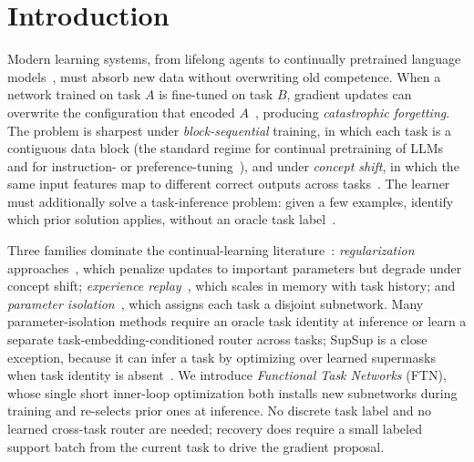 \documentclass{article}
\theoremstyle{plain}
\theoremstyle{remark}
\begin{document}
\section{Introduction}
\label{sec:intro}
Modern learning systems, from lifelong agents to continually pretrained language models~\citep{gururangan2020dontstop,yildiz2024investigating}, must absorb new data without overwriting old competence. When a network trained on task $A$ is fine-tuned on task $B$, gradient updates can overwrite the configuration that encoded $A$~\citep{mccloskey1989catastrophic,french1999catastrophic}, producing \emph{catastrophic forgetting}. The problem is sharpest under \emph{block-sequential} training, in which each task is a contiguous data block (the standard regime for continual pretraining of LLMs and for instruction- or preference-tuning~\citep{ouyang2022training,rafailov2023direct}), and under \emph{concept shift}, in which the same input features map to different correct outputs across tasks~\citep{gama2014concept}. The learner must additionally solve a task-inference problem: given a few examples, identify which prior solution applies, without an oracle task label~\citep{aljundi2019taskfree,vandeven2019three}.

Three families dominate the continual-learning literature~\citep{parisi2019continual}: \emph{regularization} approaches~\citep{kirkpatrick2017overcoming,zenke2017continual}, which penalize updates to important parameters but degrade under concept shift; \emph{experience replay}~\citep{rebuffi2017icarl,lopez2017gradient}, which scales in memory with task history; and \emph{parameter isolation}~\citep{mallya2018packnet,serra2018overcoming,wortsman2020supermasks,rusu2016progressive,yoon2018lifelong}, which assigns each task a disjoint subnetwork. Many parameter-isolation methods require an oracle task identity at inference or learn a separate task-embedding-conditioned router across tasks; SupSup is a close exception, because it can infer a task by optimizing over learned supermasks when task identity is absent~\citep{wortsman2020supermasks}. We introduce \emph{Functional Task Networks} (FTN), whose single short inner-loop optimization both installs new subnetworks during training and re-selects prior ones at inference. No discrete task label and no learned cross-task router are needed; recovery does require a small labeled support batch from the current task to drive the gradient proposal.
\end{document}
